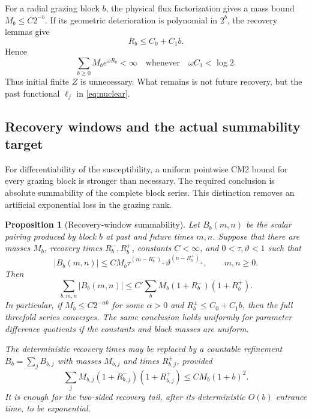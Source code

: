 \documentclass[11pt]{article}
\newtheorem{proposition}[theorem]{Proposition}
\begin{document}
For a radial grazing block $b$, the physical flux factorization gives a mass
bound $M_b\le C2^{-b}$.  If its geometric deterioration is polynomial in
$2^b$, the recovery lemmas give
\[
 R_b\le C_0+C_1b.
\]
Hence
\begin{equation}
\label{eq:recovery-sum}
 \sum_{b\ge0}M_be^{\omega R_b}<\infty
 \quad\text{whenever}\quad \omega C_1<\log2.
\end{equation}
Thus initial finite $Z$ is unnecessary.  What remains is not future recovery,
but the past functional $\ell_j$ in \eqref{eq:nuclear}.

\subsection{Recovery windows and the actual summability target}

For differentiability of the susceptibility, a uniform pointwise CM2 bound
for every grazing block is stronger than necessary.  The required conclusion
is absolute summability of the complete block series.  This distinction
removes an artificial exponential loss in the grazing rank.

\begin{proposition}[Recovery-window summability]
\label{prop:recovery-window-summability}
Let $B_b(m,n)$ be the scalar pairing produced by block $b$ at past and future
times $m,n$.  Suppose that there are masses $M_b$, recovery times
$R_b^-,R_b^+$, constants $C<\infty$, and $0<\tau,\vartheta<1$ such that
\begin{equation}
\label{eq:shifted-block-decay}
 |B_b(m,n)|
 \le CM_b\tau^{(m-R_b^-)_{+}}
             \vartheta^{(n-R_b^+)_{+}},
 \qquad m,n\ge0.
\end{equation}
Then
\begin{equation}
\label{eq:recovery-window-sum}
 \sum_{b,m,n}|B_b(m,n)|
 \le C'
 \sum_bM_b(1+R_b^-)(1+R_b^+).
\end{equation}
In particular, if $M_b\le C2^{-\alpha b}$ for some $\alpha>0$ and
$R_b^\pm\le C_0+C_1b$, then the full threefold series converges.  The same
conclusion holds uniformly for parameter difference quotients if the
constants and block masses are uniform.

The deterministic recovery times may be replaced by a countable refinement
$B_b=\sum_jB_{b,j}$ with masses $M_{b,j}$ and times $R_{b,j}^\pm$, provided
\begin{equation}
\label{eq:bi-recovery-moment}
 \sum_jM_{b,j}(1+R_{b,j}^-)(1+R_{b,j}^+)
 \le CM_b(1+b)^2.
\end{equation}
It is enough for the two-sided recovery tail, after its deterministic
$O(b)$ entrance time, to be exponential.
\end{proposition}
\end{document}
